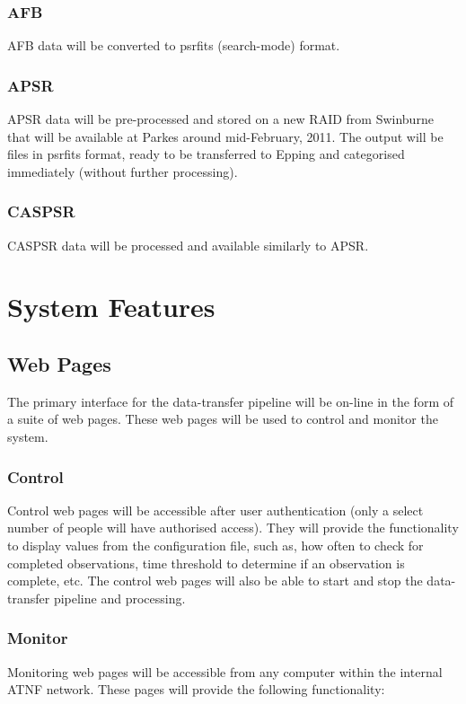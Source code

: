 \documentclass[a4paper,11pt]{article}
\begin{document}
\subsubsection{AFB}
AFB data will be converted to psrfits (search-mode) format.

\subsubsection{APSR}
APSR data will be pre-processed and stored on a new RAID from Swinburne that will be available at Parkes around mid-February, 2011. The output will be files in psrfits format, ready to be transferred to Epping and categorised immediately (without further processing).

\subsubsection{CASPSR}
CASPSR data will be processed and available similarly to APSR.

\section{System Features}

\subsection{Web Pages}
The primary interface for the data-transfer pipeline will be on-line in the form of a suite of web pages. These web pages will be used to control and monitor the system.

\subsubsection{Control}
Control web pages will be accessible after user authentication (only a select number of people will have authorised access). They will provide the functionality to display values from the configuration file, such as, how often to check for completed observations, time threshold to determine if an observation is complete, etc. The control web pages will also be able to start and stop the data-transfer pipeline and processing.

\subsubsection{Monitor}
Monitoring web pages will be accessible from any computer within the internal ATNF network. These pages will provide the following functionality:
\end{document}
